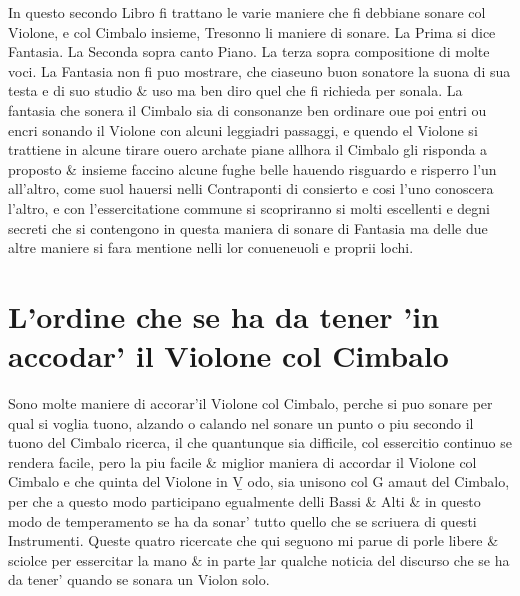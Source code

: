 
In questo secondo Libro fi trattano le varie maniere che fi debbiane sonare col Violone, e col Cimbalo insieme, Tresonno li maniere di sonare. La Prima si dice Fantasia. La Seconda sopra canto Piano. La terza sopra compositione di molte voci. La Fantasia non fi puo mostrare, che ciaseuno buon sonatore la suona di sua testa e di suo studio \& uso ma ben diro quel che fi richieda per sonala. La fantasia che sonera il Cimbalo sia di consonanze ben ordinare oue poi \b{entri ou encri} sonando il Violone con alcuni leggiadri passaggi, e quendo el Violone si trattiene in alcune tirare ouero archate piane allhora il Cimbalo gli risponda a proposto \& insieme faccino alcune fughe belle hauendo risguardo e risperro l'un all'altro, come suol hauersi nelli Contraponti di consierto e cosi l'uno conoscera l'altro, e con l'essercitatione commune si scopriranno si molti escellenti e degni secreti che si contengono in questa maniera di sonare di Fantasia ma delle due altre maniere si fara mentione nelli lor conueneuoli e proprii lochi.

\chapter{L'ordine che se ha da tener 'in accodar' il Violone col Cimbalo}
Sono molte maniere di accorar'il Violone col Cimbalo, perche si puo sonare per qual si voglia tuono, alzando o calando nel sonare un punto o piu secondo il tuono del Cimbalo ricerca, il che quantunque sia difficile, col essercitio continuo se rendera facile, pero la piu facile \& miglior maniera di accordar il Violone col Cimbalo e che quinta del Violone in \b{V odo}, sia unisono col G amaut del Cimbalo, per che a questo modo participano egualmente delli Bassi \& Alti \& in questo modo de temperamento se ha da sonar' tutto quello che se scriuera di questi Instrumenti.
Queste quatro ricercate che qui seguono mi parue di porle libere \& sciolce per essercitar la mano \& in parte \b{lar} qualche noticia del discurso che se ha da tener' quando se sonara un Violon solo.

